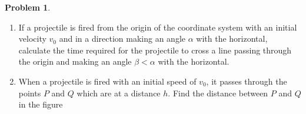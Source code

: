 \documentclass[10pt]{article}
\theoremstyle{definition}
\newtheorem{problem}{Problem}
\begin{document}
\begin{problem}~
\begin{enumerate}[label=(\alph*)]
  \item If a projectile is fired from the origin of the coordinate system with an initial velocity $v_0$ and
        in a direction making an angle $\alpha$ with the horizontal, calculate the time required for the projectile
        to cross a line passing through the origin and making an angle $\beta < \alpha$ with the
        horizontal.
  \item When a projectile is fired with an initial
        speed of $v_0$, it passes through the points $P$ and
        $Q$ which are at a distance $h$. Find the distance
        between $P$ and $Q$ in the figure
\end{enumerate}
\begin{center}
\end{center}
\end{problem}
\end{document}
